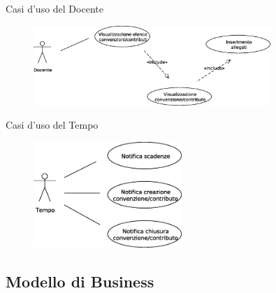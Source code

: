   
  \begin{frame}{Casi d'uso del Docente}
    \begin{figure}[h]
      \label{use_case_diag_teacher}
      \centering
      \includegraphics[width=0.8\textwidth]{images/casi_uso_docente.eps}
    \end{figure}
  \end{frame}
  
  \begin{frame}{Casi d'uso del Tempo}
    \begin{figure}[h]
      \label{use_case_diag_time}
      \centering
      \includegraphics[width = 0.5\textwidth]{images/casi_uso_tempo.eps}
    \end{figure}
  \end{frame}


  
  \subsection{Modello di Business}



